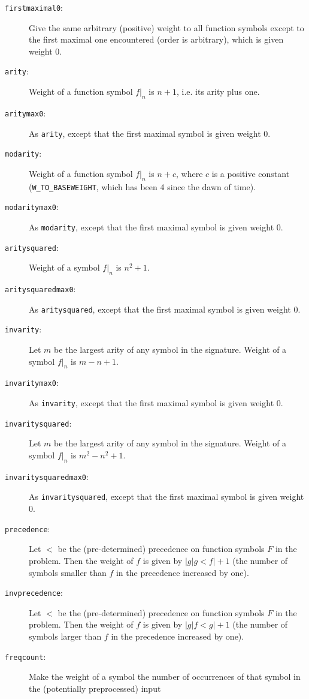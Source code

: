 \documentclass{article}
\begin{document}
\begin{description}
\item[\texttt{firstmaximal0}:] Give the same arbitrary (positive)
  weight to all function symbols except to the first maximal one
  encountered (order is arbitrary), which is given weight 0.
\item[\texttt{arity}:] Weight of a function symbol $f|_n$ is $n+1$,
  i.e. its arity plus one.
\item[\texttt{aritymax0}:] As \texttt{arity}, except that the
  first maximal symbol is given weight 0.
\item[\texttt{modarity}:] Weight of a function symbol $f|_n$ is $n+c$,
  where $c$ is a positive constant (\texttt{W\_TO\_BASEWEIGHT}, which
  has been 4 since the dawn of time).
\item[\texttt{modaritymax0}:] As \texttt{modarity}, except that the
  first maximal symbol is given weight 0.
\item[\texttt{aritysquared}:] Weight of a symbol $f|_n$ is $n^2+1$.
\item[\texttt{aritysquaredmax0}:] As \texttt{aritysquared}, except
  that the first maximal symbol is given weight 0.
\item[\texttt{invarity}:] Let $m$ be the largest arity of any symbol
  in the signature.  Weight of a symbol $f|_n$ is $m-n+1$.
\item[\texttt{invaritymax0}:] As \texttt{invarity}, except
  that the first maximal symbol is given weight 0.
\item[\texttt{invaritysquared}:] Let $m$ be the largest arity of any symbol
  in the signature.  Weight of a symbol $f|_n$ is $m^2-n^2+1$.
\item[\texttt{invaritysquaredmax0}:] As \texttt{invaritysquared},
  except that the first maximal symbol is given weight 0.
\item[\texttt{precedence}:] Let $<$ be the (pre-determined) precedence
  on function symbols $F$ in the problem. Then the weight of $f$ is
  given by $|{g|g<f}|+1$ (the number of symbols smaller than $f$ in
  the precedence increased by one).
\item[\texttt{invprecedence}:] Let $<$ be the (pre-determined)
  precedence on function symbols $F$ in the problem. Then the weight
  of $f$ is given by $|{g|f<g}|+1$ (the number of symbols larger than
  $f$ in the precedence increased by one).
\item[\texttt{freqcount}:] Make the weight of a symbol the number of
  occurrences of that symbol in the (potentially preprocessed) input

\end{description}
\end{document}
